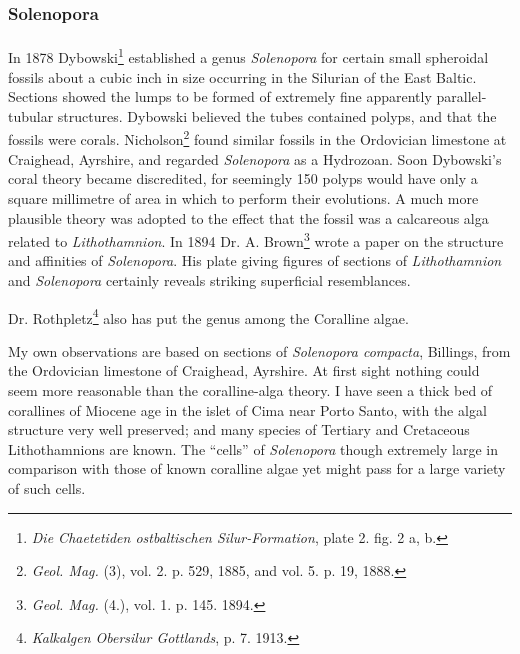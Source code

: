\documentclass[a4paper, 12pt, oneside]{article}
\begin{document}
\subsubsection{Solenopora}
\paragraph{}
In 1878 Dybowski\footnote{\emph{Die Chaetetiden ostbaltischen Silur-Formation}, plate 2. fig. 2 a, b.} established a genus \emph{Solenopora} for certain small spheroidal fossils about a cubic inch in size occurring in the Silurian of the East Baltic. Sections showed the lumps to be formed of extremely fine apparently parallel-tubular structures. Dybowski believed the tubes contained polyps, and that the fossils were corals. Nicholson\footnote{\emph{Geol. Mag.} (3), vol. 2. p. 529, 1885, and vol. 5. p. 19, 1888.} found similar fossils in the Ordovician limestone at Craighead, Ayrshire, and regarded \emph{Solenopora} as a Hydrozoan. Soon Dybowski's coral theory became discredited, for seemingly 150 polyps would have only a square millimetre of area in which to perform their evolutions. A much more plausible theory was adopted to the effect that the fossil was a calcareous alga related to \emph{Lithothamnion}. In 1894 Dr. A. Brown\footnote{\emph{Geol. Mag.} (4.), vol. 1. p. 145. 1894.} wrote a paper on the structure and affinities of \emph{Solenopora}. His plate giving figures of sections of \emph{Lithothamnion} and \emph{Solenopora} certainly reveals striking superficial resemblances.

Dr. Rothpletz\footnote{\emph{Kalkalgen Obersilur Gottlands}, p. 7. 1913.} also has put the genus among the Coralline algae.

My own observations are based on sections of \emph{Solenopora compacta}, Billings, from the Ordovician limestone of Craighead, Ayrshire. At first sight nothing could seem more reasonable than the coralline-alga theory. I have seen a thick bed of corallines of Miocene age in the islet of Cima near Porto Santo, with the algal structure very well preserved; and many species of Tertiary and Cretaceous Lithothamnions are known. The ``cells'' of \emph{Solenopora} though extremely large in comparison with those of known coralline algae yet might pass for a large variety of such cells.
\end{document}
